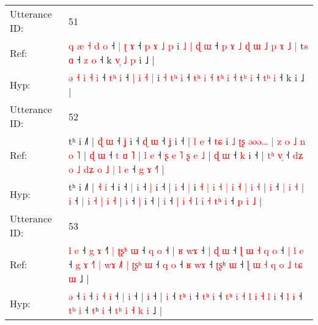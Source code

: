 \documentclass[10pt]{article}
\DeclareRobustCommand{\hl}[1]{{\textcolor{red}{#1}}}
\begin{document}
\begin{longtable}{ll}
 \\
\midrule
Utterance ID: & 51 \\
Ref: & \hl{q} \hl{æ} \hl{˧} \hl{d} \hl{o} ˧ \hl{|}\hl{ }\hl{ʈ} \hl{ɤ} ˧ \hl{p} \hl{ɤ} \hl{˩} \hl{p} i \hl{˩} \hl{|}\hl{ }\hl{ɖ} \hl{ɯ} ˧\hl{ }\hl{p}\hl{ }\hl{ɤ} \hl{˩}\hl{ }\hl{ɖ} \hl{ɯ} \hl{˩} \hl{p}\hl{ }\hl{ɤ} \hl{˩} \hl{|} t\hl{s} \hl{ɑ} ˧ \hl{}\hl{z} \hl{o} ˧ k\hl{ }\hl{v}\hl{̩}\hl{ }\hl{˩}\hl{ }\hl{p} i ˩ |
 \\
Hyp: & \hl{ə} \hl{˧} \hl{i} \hl{˧} \hl{i} ˧ \hl{}\hl{t}\hl{ʰ} \hl{i} ˧ \hl{|} \hl{i} \hl{˧} \hl{|} i \hl{˧} \hl{}\hl{t}\hl{ʰ} \hl{i} ˧\hl{}\hl{}\hl{}\hl{} \hl{}\hl{t}\hl{ʰ} \hl{i} \hl{˧} \hl{}\hl{t}\hl{ʰ} \hl{i} \hl{˧} t\hl{ʰ} \hl{i} ˧ \hl{t}\hl{ʰ} \hl{i} ˧ k\hl{}\hl{}\hl{}\hl{}\hl{}\hl{}\hl{} i ˩ |
 \\
\midrule
Utterance ID: & 52 \\
Ref: & tʰ i ˩˥ | \hl{ɖ} \hl{ɯ} ˧\hl{ }\hl{ʝ} i ˧ \hl{ɖ} \hl{ɯ} ˧ \hl{ʝ} i ˧ |\hl{ }\hl{l} \hl{e} ˧ \hl{t}\hl{ɕ} i \hl{˩} \hl{ʈ}\hl{ʂ} \hl{ə}\hl{ə}\hl{ə}\hl{…} \hl{|} \hl{z} \hl{o} \hl{˩} \hl{n} \hl{o} \hl{˥} |\hl{ }\hl{ɖ} \hl{ɯ} ˧ \hl{t} \hl{ɑ} \hl{˥} |\hl{ }\hl{l} \hl{e} ˧ \hl{ʂ} \hl{e} \hl{˥} \hl{ʂ} \hl{e} \hl{˩} |\hl{ }\hl{ɖ} \hl{ɯ} ˧ \hl{k} i ˧ |\hl{ }\hl{t}\hl{ʰ} \hl{v}\hl{̩} ˧ \hl{d}\hl{ʑ} \hl{o} \hl{˩} \hl{d}\hl{ʑ} \hl{o} \hl{˩} \hl{|}\hl{ }\hl{l} \hl{e} ˧ \hl{g} \hl{ɤ} \hl{˧}\hl{˥} |
 \\
Hyp: & tʰ i ˩˥ | \hl{˧} \hl{i} ˧\hl{}\hl{} i ˧ \hl{|} \hl{i} ˧ \hl{|} i ˧ |\hl{}\hl{} \hl{i} ˧ \hl{}\hl{|} i \hl{˧} \hl{}\hl{|} \hl{}\hl{}\hl{}\hl{i} \hl{˧} \hl{|} \hl{i} \hl{˧} \hl{|} \hl{i} \hl{˧} |\hl{}\hl{} \hl{i} ˧ \hl{|} \hl{i} \hl{˧} |\hl{}\hl{} \hl{i} ˧ \hl{|} \hl{i} \hl{˧} \hl{|} \hl{i} \hl{˧} |\hl{}\hl{} \hl{i} ˧ \hl{|} i ˧ |\hl{}\hl{}\hl{} \hl{}\hl{i} ˧ \hl{}\hl{|} \hl{i} \hl{˧} \hl{}\hl{l} \hl{i} \hl{˧} \hl{}\hl{t}\hl{ʰ} \hl{i} ˧ \hl{p} \hl{i} \hl{}\hl{˩} |
 \\
\midrule
Utterance ID: & 53 \\
Ref: & \hl{l}\hl{ }\hl{e} ˧\hl{ }\hl{g} \hl{ɤ} ˧\hl{˥} \hl{|} \hl{ʈ}\hl{ʂ}\hl{ʰ} \hl{ɯ} ˧ \hl{q} \hl{o} ˧ |\hl{ }\hl{ʁ} \hl{w}\hl{ɤ} ˧ |\hl{ }\hl{ɖ} \hl{ɯ} ˧\hl{ }\hl{ɭ}\hl{ }\hl{ɯ} \hl{˧}\hl{ }\hl{q} \hl{o} ˧ \hl{|}\hl{ }\hl{l} \hl{e} ˧ \hl{g}\hl{ }\hl{ɤ} \hl{˧}\hl{˥} \hl{|} \hl{w}\hl{ɤ} \hl{˩}\hl{˥} \hl{|} \hl{ʈ}\hl{ʂ}\hl{ʰ} \hl{ɯ} ˧ \hl{q} \hl{o} ˧ \hl{ʁ}\hl{ }\hl{w}\hl{ɤ} ˧ \hl{ʈ}\hl{ʂ}ʰ \hl{ɯ} ˧\hl{ }\hl{ɭ}\hl{ }\hl{ɯ} \hl{˧}\hl{ }\hl{q} \hl{o} \hl{˩} \hl{t}\hl{ɕ} \hl{ɯ} ˩ |
 \\
Hyp: & \hl{}\hl{}\hl{ə} ˧\hl{}\hl{} \hl{i} ˧\hl{} \hl{i} \hl{}\hl{}\hl{˧} \hl{i} ˧ \hl{|} \hl{i} ˧ |\hl{}\hl{} \hl{}\hl{i} ˧ |\hl{}\hl{} \hl{i} ˧\hl{}\hl{}\hl{}\hl{} \hl{}\hl{t}\hl{ʰ} \hl{i} ˧ \hl{}\hl{t}\hl{ʰ} \hl{i} ˧ \hl{}\hl{t}\hl{ʰ} \hl{}\hl{i} \hl{˧} \hl{}\hl{l} \hl{}\hl{i} \hl{˧} \hl{}\hl{}\hl{l} \hl{i} ˧ \hl{l} \hl{i} ˧ \hl{t}\hl{ʰ}\hl{ }\hl{i} ˧ \hl{}\hl{t}ʰ \hl{i} ˧\hl{}\hl{}\hl{}\hl{} \hl{}\hl{t}\hl{ʰ} \hl{i} \hl{˧} \hl{}\hl{k} \hl{i} ˩ |

\end{longtable}
\end{document}
